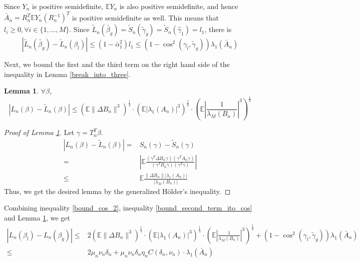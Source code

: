 \documentclass{article} \usepackage{iclr2019_conference,times}
\newtheorem{lemma}[theorem]{Lemma}
\newcommand{\expe}{\mathbb{E}}
\begin{document}
Since $Y_n$ is positive semidefinite, $\expe Y_n$ is also positive semidefinite, and hence $\bar{A}_n = R_n^T \expe Y_n (R_n^{-1})^T$ is positive semidefinite as well. This means that $l_i \geq 0, \forall i \in \{1, ..., M \}$. Since $\tilde{L}_n(\tilde{\beta_g}) = \tilde{S}_n(\tilde{\gamma}_g) = \tilde{S}_n(\hat{\gamma}_1) = l_1$, there is
\begin{equation}
\label{bound_second_term_ito_cos}
    |\tilde{L}_n(\tilde{\beta_g}) - \tilde{L}_n(\beta_l)| \leq (1 - \bar{\alpha}_1^2) l_1 \leq (1 - \cos^2(\gamma_l, \tilde{\gamma}_g)) \lambda_1 (\bar{A}_n)
\end{equation}


Next, we bound the first and the third term on the right hand side of the inequality in Lemma \ref{break_into_three}.

\begin{lemma}
\label{perturbation_loss}
$\forall \beta$,
\begin{equation}
\label{bound_1_and_3}
    |L_n(\beta) - \tilde{L}_n(\beta)| \leq (\expe \| \Delta B_n \|^3)^{\frac{1}{3}} \cdot (\expe |\lambda_1(A_n)|^3)^{\frac{1}{3}} \cdot \left(\expe |\frac{1}{\lambda_M(B_n)}|^3\right)^{\frac{1}{3}}
\end{equation}
\end{lemma}

\begin{proof}[Proof of Lemma \ref{perturbation_loss}]
Let $\gamma = T_n^T \beta$.
\begin{equation}
\begin{split}
    |L_n(\beta) - \tilde{L}_n(\beta)| =& S_n(\gamma) - \tilde{S}_n(\gamma) \\
    =& \left|\expe \frac{(\gamma^T \Delta B_n \gamma)(\gamma^T A_n \gamma)}{(\gamma^T B_n \gamma)(\gamma^T \gamma)}\right| \\
    \leq& \expe \frac{\| \Delta B_n \| |\lambda_1(A_n)|}{|\lambda_M(B_n)|}
\end{split}
\end{equation}
Thus, we get the desired lemma by the generalized H{\"o}lder's inequality.

\end{proof}

Combining inequality \ref{bound_cos_2}, inequality \ref{bound_second_term_ito_cos} and Lemma \ref{perturbation_loss}, we get
\begin{equation}
\begin{split}
    |L_n(\beta_l) - L_n(\beta_g)| \leq & 2 (\expe \| \Delta B_n \|^3)^{\frac{1}{3}} \cdot (\expe |\lambda_1(A_n)|^3)^{\frac{1}{3}} \cdot \left(\expe \left|\frac{1}{\lambda_M(B_n)}\right|^3\right)^{\frac{1}{3}} + (1 - \cos^2(\gamma_l, \tilde{\gamma}_g)) \lambda_1 (\bar{A}_n) \\
    \leq & 2 \mu_n \nu_n \delta_n + \mu_n \nu_n \delta_n \eta_n C(\delta_n, \nu_n) \cdot \lambda_1 (\bar{A}_n)
\end{split}
\end{equation}
\end{document}
